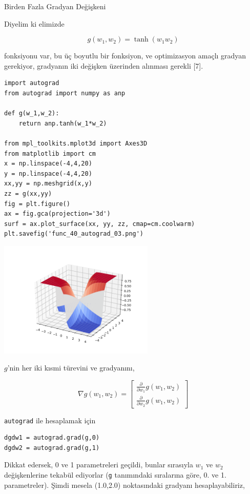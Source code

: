 \documentclass[12pt,fleqn]{article}\usepackage{../../common}
\begin{document}
Birden Fazla Gradyan Değişkeni

Diyelim ki elimizde 

$$
g(w_1,w_2) = \tanh (w_1w_2)
$$

fonksiyonu var, bu üç boyutlu bir fonksiyon, ve optimizasyon amaçlı gradyan
gerekiyor, gradyanın iki değişken üzerinden alınması gerekli [7]. 

\begin{verbatim}
import autograd
from autograd import numpy as anp

def g(w_1,w_2):
    return anp.tanh(w_1*w_2)

from mpl_toolkits.mplot3d import Axes3D
from matplotlib import cm
x = np.linspace(-4,4,20)
y = np.linspace(-4,4,20)
xx,yy = np.meshgrid(x,y)
zz = g(xx,yy)
fig = plt.figure()
ax = fig.gca(projection='3d')
surf = ax.plot_surface(xx, yy, zz, cmap=cm.coolwarm)
plt.savefig('func_40_autograd_03.png')
\end{verbatim}

\includegraphics[width=20em]{func_40_autograd_03.png}

$g$'nin her iki kısmi türevini ve gradyanını, 

$$
\nabla g(w_1,w_2) = \left[\begin{array}{r}
\frac{\partial }{\partial w_1} g(w_1,w_2) \\
\frac{\partial }{\partial w_2} g(w_1,w_2) 
\end{array}\right]
$$

\verb!autograd! ile hesaplamak için 

\begin{verbatim}
dgdw1 = autograd.grad(g,0)
dgdw2 = autograd.grad(g,1)
\end{verbatim}

Dikkat edersek, 0 ve 1 parametreleri geçildi, bunlar sırasıyla $w_1$ ve
$w_2$ değişkenlerine tekabül ediyorlar (\verb!g! tanımındaki sıralarına
göre, 0. ve 1. parametreler). Şimdi mesela (1.0,2.0) noktasındaki gradyanı
hesaplayabiliriz,
\end{document}
